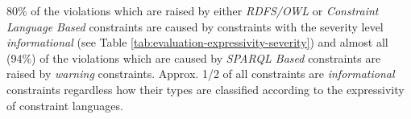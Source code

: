 \documentclass[conference]{IEEEtran}
\begin{document}
80\% of the violations which are raised by either \emph{RDFS/OWL} or \emph{Constraint Language Based} constraints are caused by constraints with the severity level \emph{informational} (see Table \ref{tab:evaluation-expressivity-severity}) and almost all (94\%) of the violations which are caused by \emph{SPARQL Based} constraints are raised by \emph{warning} constraints. Approx. 1/2 of all constraints are \emph{informational} constraints regardless how their types are classified according to the expressivity of constraint languages.

\end{document}
